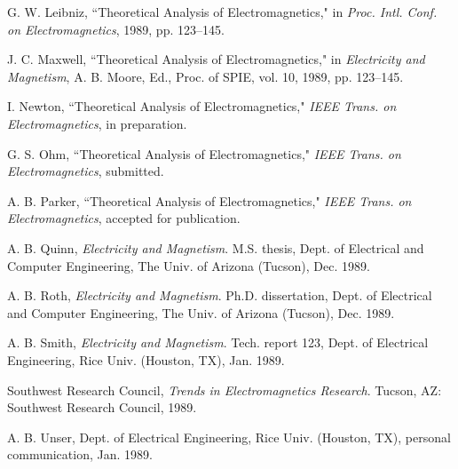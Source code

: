 \begin{thebibliography}{99}
G. W. Leibniz, ``Theoretical Analysis of Electromagnetics,"
in \emph{Proc. Intl. Conf. on Electromagnetics}, 1989, pp. 123--145.

J. C. Maxwell, ``Theoretical Analysis of Electromagnetics,"
in \emph{Electricity and Magnetism}, A. B. Moore, Ed., Proc. of SPIE,
vol. 10, 1989, pp. 123--145.

I. Newton, ``Theoretical Analysis of Electromagnetics,"
\emph{IEEE Trans. on Electromagnetics}, in preparation.

G. S. Ohm, ``Theoretical Analysis of Electromagnetics,"
\emph{IEEE Trans. on Electromagnetics}, submitted.

A. B. Parker, ``Theoretical Analysis of Electromagnetics,"
\emph{IEEE Trans. on Electromagnetics}, accepted for publication.

A. B. Quinn, \emph{Electricity and Magnetism}.
M.S. thesis, Dept. of Electrical and Computer Engineering,
The Univ. of Arizona (Tucson), Dec. 1989.

A. B. Roth, \emph{Electricity and Magnetism}.
Ph.D. dissertation, Dept. of Electrical and Computer Engineering,
The Univ. of Arizona (Tucson), Dec. 1989.

A. B. Smith, \emph{Electricity and Magnetism}.
Tech. report 123, Dept. of Electrical Engineering,
Rice Univ. (Houston, TX), Jan. 1989.

Southwest Research Council, \emph{Trends in Electromagnetics Research}.
Tucson, AZ: Southwest Research Council, 1989.

A. B. Unser, Dept. of Electrical Engineering, Rice Univ. (Houston, TX),
personal communication, Jan. 1989.

\end{thebibliography}
